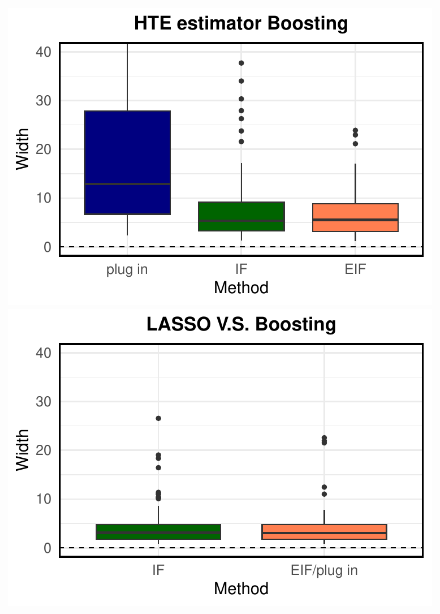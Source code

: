 \begin{figure}[ht]
\begin{minipage}{0.3\textwidth}
                \includegraphics[clip, trim = 0cm 0cm 0cm 0cm, width = \textwidth]{plot/ACIC_linear_propensity_nonlinear_HTE_CI_width_Boosting.pdf}
        \end{minipage}
        \begin{minipage}{0.3\textwidth}
                \centering
                \includegraphics[clip, trim = 0cm 0cm 0cm 0cm, width = \textwidth]{plot/ACIC_linear_propensity_nonlinear_HTE_CI_width_LASSO_V.S._Boosting.pdf}
        \end{minipage}        
        

\end{figure}
